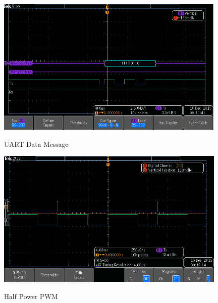 \documentclass[12pt]{article}
\begin{document}
\begin{figure}[H]
\begin {center}
\includegraphics[scale=.75]{uart-message}\\
\caption{UART Data Message}
\end {center}
\end{figure}


\begin{figure}[H]
\begin {center}
\includegraphics[scale=.75]{half-power}\\
\caption{Half Power PWM}
\end {center}
\end{figure}
\end{document}
